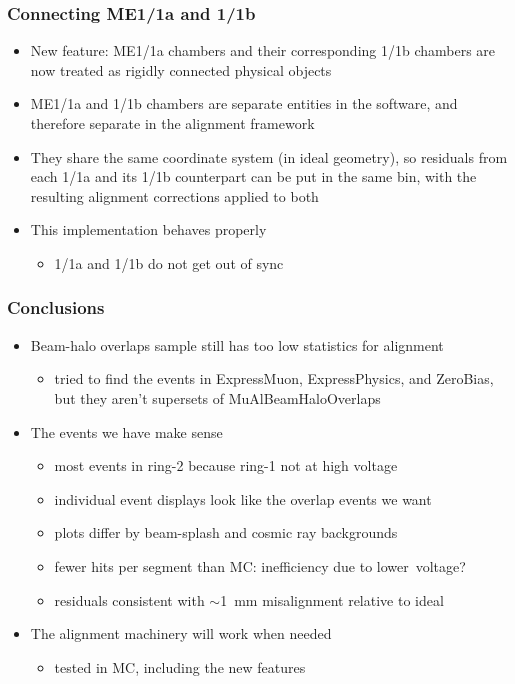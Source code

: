 \documentclass[compress]{beamer}
\begin{document}
\begin{frame}
\frametitle{Connecting ME1/1a and 1/1b}
\begin{itemize}\setlength{\itemsep}{0.3 cm}
\item New feature: ME1/1a chambers and their corresponding 1/1b chambers are now treated as rigidly connected physical objects

\item ME1/1a and 1/1b chambers are separate entities in the software,
  and therefore separate in the alignment framework

\item They share the same coordinate system (in ideal geometry), so
  residuals from each 1/1a and its 1/1b counterpart can be put in
  the same bin, with the resulting alignment corrections applied to both

\item This implementation behaves properly
\begin{itemize}
\item 1/1a and 1/1b do not get out of sync
\end{itemize}
\end{itemize}
\end{frame}

\begin{frame}
\frametitle{Conclusions}
\begin{itemize}\setlength{\itemsep}{0.5 cm}
\item Beam-halo overlaps sample still has too low statistics for alignment
\begin{itemize}
\item tried to find the events in ExpressMuon, ExpressPhysics, and ZeroBias, but they aren't supersets of MuAlBeamHaloOverlaps
\end{itemize}

\item The events we have make sense
\begin{itemize}\setlength{\itemsep}{0.1 cm}
\item most events in ring-2 because ring-1 not at high voltage
\item individual event displays look like the overlap events we want
\item plots differ by beam-splash and cosmic ray backgrounds
\item fewer hits per segment than MC: inefficiency due to \mbox{lower voltage?\hspace{-1 cm}}
\item residuals consistent with $\sim$1~mm misalignment relative to ideal
\end{itemize}

\item The alignment machinery will work when needed
\begin{itemize}
\item tested in MC, including the new features
\end{itemize}
\end{itemize}
\label{numpages}
\end{frame}
\end{document}
